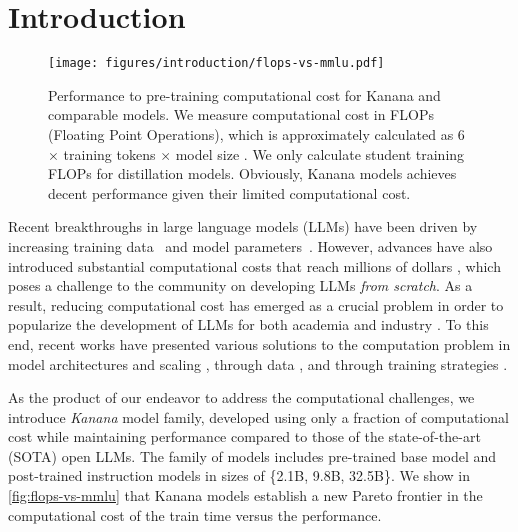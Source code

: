 \section{Introduction}
\begin{figure}[ht]
    \centering
    \texttt{[image: figures/introduction/flops-vs-mmlu.pdf]}
    \caption{
    Performance to pre-training computational cost for Kanana and comparable models.
    We measure computational cost in FLOPs (Floating Point Operations), which is approximately calculated as 6 $\times$ training tokens $\times$ model size \citep{kaplan2020scalinglaws}.
    We only calculate student training FLOPs for distillation models.
    Obviously, Kanana models achieves decent performance given their limited computational cost.
    }
    \label{fig:flops-vs-mmlu}
\end{figure}


Recent breakthroughs in large language models (LLMs) have been driven by increasing training data~\citep{chinchilla} and model parameters~\citep{gpt3, kaplan2020scalinglaws, palm}.
However, advances have also introduced substantial computational costs that reach millions of dollars \citep{llama3}, which poses a challenge to the community on developing LLMs \textit{from scratch}.
As a result, reducing computational cost has emerged as a crucial problem in order to popularize the development of LLMs for both academia and industry \citep{zhao2024galore, fishman2025scaling-fp8, wang2025fp4-training}. 
To this end, recent works have presented various solutions to the computation problem in model architectures and scaling \citep{deepseek-v2, kim2023solar, muralidharan2024compact}, through data \citep{fineweb-edu, ask-llm}, and through training strategies \citep{deepseek-llm, minicpm}.

As the product of our endeavor to address the computational challenges, we introduce \textit{Kanana} model family, developed using only a fraction of computational cost while maintaining performance compared to those of the state-of-the-art (SOTA) open LLMs.
The family of models includes pre-trained base model and post-trained instruction models in sizes of \{2.1B, 9.8B, 32.5B\}. 
We show in \autoref{fig:flops-vs-mmlu} that Kanana models establish a new Pareto frontier in the computational cost of the train time versus the performance.

